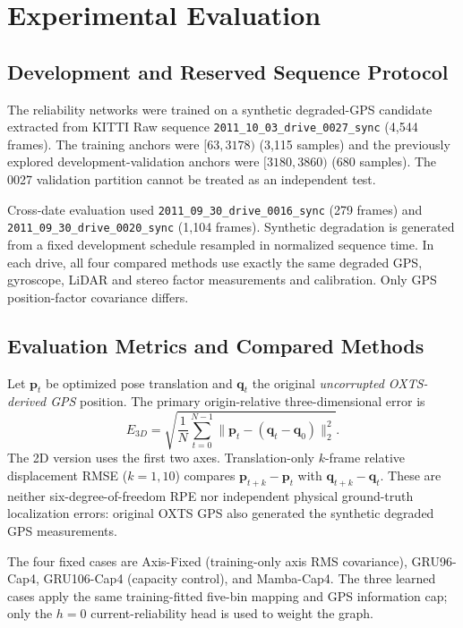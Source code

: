 \section{Experimental Evaluation}
\label{sec:experiments_v7}

\subsection{Development and Reserved Sequence Protocol}
The reliability networks were trained on a synthetic degraded-GPS
candidate extracted from KITTI Raw sequence
\texttt{2011\_10\_03\_drive\_0027\_sync} (4,544 frames).
The training anchors were $[63,3178)$ (3,115 samples)
and the previously explored development-validation anchors were
$[3180,3860)$ (680 samples). The 0027 validation partition
cannot be treated as an independent test.

Cross-date evaluation used
\texttt{2011\_09\_30\_drive\_0016\_sync} (279 frames) and
\texttt{2011\_09\_30\_drive\_0020\_sync} (1,104 frames).
Synthetic degradation is generated from a fixed development
schedule resampled in normalized sequence time. In each drive,
all four compared methods use exactly the same degraded GPS,
gyroscope, LiDAR and stereo factor measurements and calibration.
Only GPS position-factor covariance differs.

\subsection{Evaluation Metrics and Compared Methods}
Let $\mathbf{p}_t$ be optimized pose translation and
$\mathbf{q}_t$ the original \emph{uncorrupted OXTS-derived GPS}
position. The primary origin-relative three-dimensional error is
\begin{equation}
E_{3D}=\sqrt{\frac{1}{N}
\sum_{t=0}^{N-1}
\|\mathbf{p}_t-(\mathbf{q}_t-\mathbf{q}_0)\|_2^2}.
\label{eq:v7_eval_rmse}
\end{equation}
The 2D version uses the first two axes. Translation-only
$k$-frame relative displacement RMSE ($k=1,10$)
compares $\mathbf{p}_{t+k}-\mathbf{p}_t$ with
$\mathbf{q}_{t+k}-\mathbf{q}_t$. These are neither
six-degree-of-freedom RPE nor independent physical
ground-truth localization errors: original OXTS GPS
also generated the synthetic degraded GPS measurements.

The four fixed cases are Axis-Fixed (training-only
axis RMS covariance), GRU96-Cap4, GRU106-Cap4
(capacity control), and Mamba-Cap4. The three
learned cases apply the same training-fitted five-bin
mapping and GPS information cap; only the $h=0$
current-reliability head is used to weight the graph.

